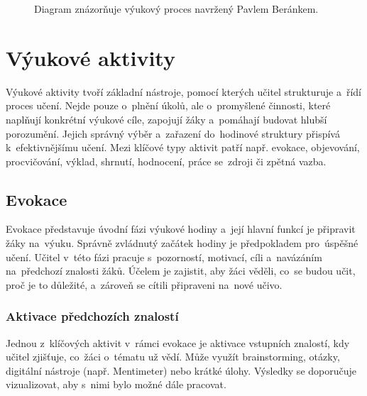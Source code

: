 \documentclass[male,czech,api_bc]{kitheses}
\begin{document}
\begin{figure}[H]
	\centering
	\caption{Diagram znázorňuje výukový proces navržený Pavlem Beránkem.}
	\label{fig:vyukovy-proces}
\end{figure}

\section{Výukové aktivity}
Výukové aktivity tvoří základní nástroje, pomocí kterých učitel strukturuje a~řídí proces učení. Nejde pouze o~plnění úkolů, ale o~promyšlené činnosti, které naplňují konkrétní výukové cíle, zapojují žáky a~pomáhají budovat hlubší porozumění. Jejich správný výběr a~zařazení do~hodinové struktury přispívá k~efektivnějšímu učení. Mezi klíčové typy aktivit patří např. evokace, objevování, procvičování, výklad, shrnutí, hodnocení, práce se~zdroji či zpětná vazba.

\subsection{Evokace}

Evokace představuje úvodní fázi výukové hodiny a~její hlavní funkcí je připravit žáky na~výuku. Správně zvládnutý začátek hodiny je předpokladem pro~úspěšné učení. Učitel v~této fázi pracuje s~pozorností, motivací, cíli a~navázáním na~předchozí znalosti žáků. Účelem je zajistit, aby žáci věděli, co~se budou učit, proč je to důležité, a~zároveň se cítili připraveni na~nové učivo.

\subsubsection{Aktivace předchozích znalostí} Jednou z~klíčových aktivit v~rámci evokace je aktivace vstupních znalostí, kdy učitel zjišťuje, co~žáci o~tématu už vědí. Může využít brainstorming, otázky, digitální nástroje (např. Mentimeter) nebo krátké úlohy. Výsledky se doporučuje vizualizovat, aby s~nimi bylo možné dále pracovat.
\end{document}
